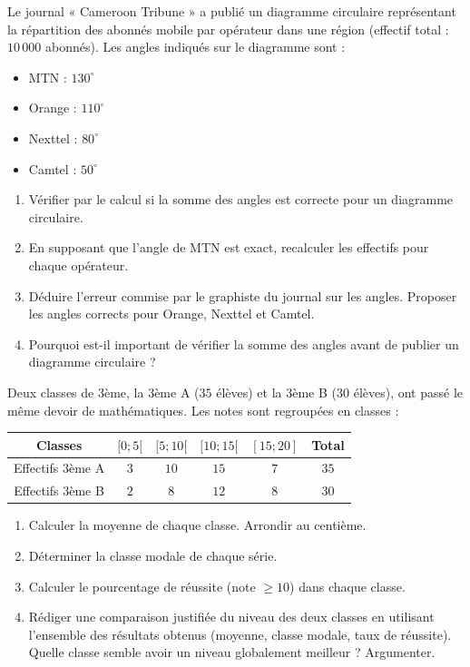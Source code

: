 \documentclass[11pt]{article}
\begin{document}
\begin{exercice}
Le journal « Cameroon Tribune » a publié un diagramme circulaire représentant la répartition des abonnés mobile par opérateur dans une région (effectif total : $10\,000$ abonnés). Les angles indiqués sur le diagramme sont :
\begin{itemize}
    \item MTN : $130^\circ$
    \item Orange : $110^\circ$
    \item Nexttel : $80^\circ$
    \item Camtel : $50^\circ$
\end{itemize}
\begin{enumerate}
    \item Vérifier par le calcul si la somme des angles est correcte pour un diagramme circulaire.
    \item En supposant que l'angle de MTN est exact, recalculer les effectifs pour chaque opérateur.
    \item Déduire l'erreur commise par le graphiste du journal sur les angles. Proposer les angles corrects pour Orange, Nexttel et Camtel.
    \item Pourquoi est-il important de vérifier la somme des angles avant de publier un diagramme circulaire ?
\end{enumerate}
\end{exercice}

\begin{exercice}
Deux classes de 3ème, la 3ème A ($35$ élèves) et la 3ème B ($30$ élèves), ont passé le même devoir de mathématiques. Les notes sont regroupées en classes :
\begin{center}
\begin{tabular}{|c|c|c|c|c|c|}\hline
Classes & $[0 ; 5[$ & $[5 ; 10[$ & $[10 ; 15[$ & $[15 ; 20]$ & Total \\ \hline
Effectifs 3ème A & $3$ & $10$ & $15$ & $7$ & $35$ \\ \hline
Effectifs 3ème B & $2$ & $8$ & $12$ & $8$ & $30$ \\ \hline
\end{tabular}
\end{center}
\begin{enumerate}
    \item Calculer la moyenne de chaque classe. Arrondir au centième.
    \item Déterminer la classe modale de chaque série.
    \item Calculer le pourcentage de réussite (note $\ge 10$) dans chaque classe.
    \item Rédiger une comparaison justifiée du niveau des deux classes en utilisant l'ensemble des résultats obtenus (moyenne, classe modale, taux de réussite). Quelle classe semble avoir un niveau globalement meilleur ? Argumenter.
\end{enumerate}
\end{exercice}
\end{document}
